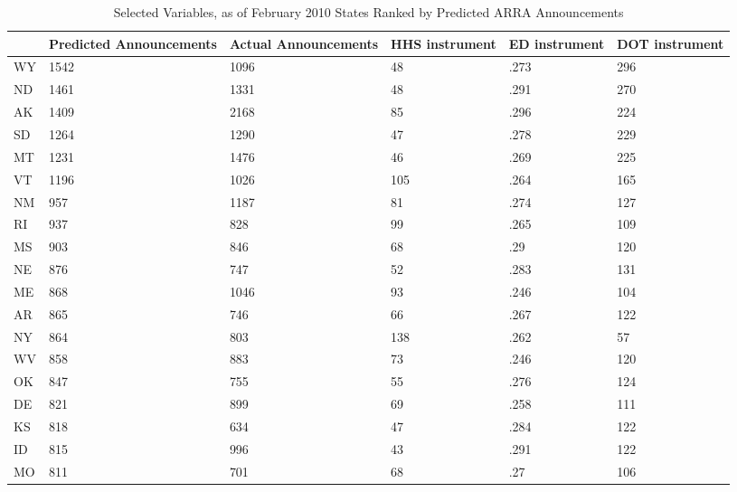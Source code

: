 \begin{table}[htbp]
\caption{\label{Tab:Predicted_ARRA_Announcements} Selected Variables, as of February 2010 States Ranked by Predicted ARRA Announcements}\centering\medskip
\begin{tabular}{|l|l|l|l|l|l|}\hline  
 & Predicted Announcements  & Actual Announcements  & HHS instrument  & ED instrument  & DOT instrument  \\ \hline  
WY &      1542 &      1096 &        48 &      .273 &       296 \\ \hline 
ND &      1461 &      1331 &        48 &      .291 &       270 \\ \hline 
AK &      1409 &      2168 &        85 &      .296 &       224 \\ \hline 
SD &      1264 &      1290 &        47 &      .278 &       229 \\ \hline 
MT &      1231 &      1476 &        46 &      .269 &       225 \\ \hline 
VT &      1196 &      1026 &       105 &      .264 &       165 \\ \hline 
NM &       957 &      1187 &        81 &      .274 &       127 \\ \hline 
RI &       937 &       828 &        99 &      .265 &       109 \\ \hline 
MS &       903 &       846 &        68 &       .29 &       120 \\ \hline 
NE &       876 &       747 &        52 &      .283 &       131 \\ \hline 
ME &       868 &      1046 &        93 &      .246 &       104 \\ \hline 
AR &       865 &       746 &        66 &      .267 &       122 \\ \hline 
NY &       864 &       803 &       138 &      .262 &        57 \\ \hline 
WV &       858 &       883 &        73 &      .246 &       120 \\ \hline 
OK &       847 &       755 &        55 &      .276 &       124 \\ \hline 
DE &       821 &       899 &        69 &      .258 &       111 \\ \hline 
KS &       818 &       634 &        47 &      .284 &       122 \\ \hline 
ID &       815 &       996 &        43 &      .291 &       122 \\ \hline 
MO &       811 &       701 &        68 &       .27 &       106 \\ \hline 

\end{tabular}
\end{table}

